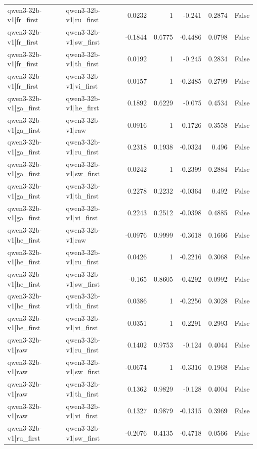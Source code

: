 \begin{table}
\begin{tabular}{l l r r r r l}
qwen3-32b-v1|fr_first & qwen3-32b-v1|ru_first & 0.0232 & 1 & -0.241 & 0.2874 & False \\
qwen3-32b-v1|fr_first & qwen3-32b-v1|sw_first & -0.1844 & 0.6775 & -0.4486 & 0.0798 & False \\
qwen3-32b-v1|fr_first & qwen3-32b-v1|th_first & 0.0192 & 1 & -0.245 & 0.2834 & False \\
qwen3-32b-v1|fr_first & qwen3-32b-v1|vi_first & 0.0157 & 1 & -0.2485 & 0.2799 & False \\
qwen3-32b-v1|ga_first & qwen3-32b-v1|he_first & 0.1892 & 0.6229 & -0.075 & 0.4534 & False \\
qwen3-32b-v1|ga_first & qwen3-32b-v1|raw & 0.0916 & 1 & -0.1726 & 0.3558 & False \\
qwen3-32b-v1|ga_first & qwen3-32b-v1|ru_first & 0.2318 & 0.1938 & -0.0324 & 0.496 & False \\
qwen3-32b-v1|ga_first & qwen3-32b-v1|sw_first & 0.0242 & 1 & -0.2399 & 0.2884 & False \\
qwen3-32b-v1|ga_first & qwen3-32b-v1|th_first & 0.2278 & 0.2232 & -0.0364 & 0.492 & False \\
qwen3-32b-v1|ga_first & qwen3-32b-v1|vi_first & 0.2243 & 0.2512 & -0.0398 & 0.4885 & False \\
qwen3-32b-v1|he_first & qwen3-32b-v1|raw & -0.0976 & 0.9999 & -0.3618 & 0.1666 & False \\
qwen3-32b-v1|he_first & qwen3-32b-v1|ru_first & 0.0426 & 1 & -0.2216 & 0.3068 & False \\
qwen3-32b-v1|he_first & qwen3-32b-v1|sw_first & -0.165 & 0.8605 & -0.4292 & 0.0992 & False \\
qwen3-32b-v1|he_first & qwen3-32b-v1|th_first & 0.0386 & 1 & -0.2256 & 0.3028 & False \\
qwen3-32b-v1|he_first & qwen3-32b-v1|vi_first & 0.0351 & 1 & -0.2291 & 0.2993 & False \\
qwen3-32b-v1|raw & qwen3-32b-v1|ru_first & 0.1402 & 0.9753 & -0.124 & 0.4044 & False \\
qwen3-32b-v1|raw & qwen3-32b-v1|sw_first & -0.0674 & 1 & -0.3316 & 0.1968 & False \\
qwen3-32b-v1|raw & qwen3-32b-v1|th_first & 0.1362 & 0.9829 & -0.128 & 0.4004 & False \\
qwen3-32b-v1|raw & qwen3-32b-v1|vi_first & 0.1327 & 0.9879 & -0.1315 & 0.3969 & False \\
qwen3-32b-v1|ru_first & qwen3-32b-v1|sw_first & -0.2076 & 0.4135 & -0.4718 & 0.0566 & False \\

\end{tabular}
\end{table}
